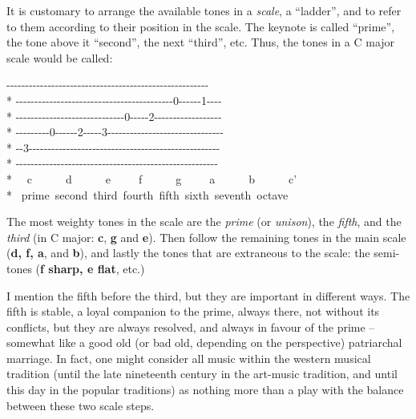 \begin{articlelayout}
It is customary to arrange the available tones in a \emph{scale}, a
``{}ladder''{}, and to refer to them according to their position in
the scale. The keynote is called ``{}prime''{}, the tone above it
``{}second''{}, the next ``{}third''{}, etc. Thus, the tones in a C
major scale would be called:
\begin{pre}\begin{adjustwidth}{2em}{0em}
{-}{-}{-}{-}{-}{-}{-}{-}{-}{-}{-}{-}{-}{-}{-}{-}{-}{-}{-}{-}{-}{-}{-}{-}{-}{-}{-}{-}{-}{-}{-}{-}{-}{-}{-}{-}{-}{-}{-}{-}{-}{-}{-}{-}{-}{-}{-}{-}{-}{-}{-}{-}{-}{-}\\*
{-}{-}{-}{-}{-}{-}{-}{-}{-}{-}{-}{-}{-}{-}{-}{-}{-}{-}{-}{-}{-}{-}{-}{-}{-}{-}{-}{-}{-}{-}{-}{-}{-}{-}{-}{-}{-}{-}{-}{-}{-}{-}0{-}{-}{-}{-}{-}{-}1{-}{-}{-}{-}\\*
{-}{-}{-}{-}{-}{-}{-}{-}{-}{-}{-}{-}{-}{-}{-}{-}{-}{-}{-}{-}{-}{-}{-}{-}{-}{-}{-}{-}-0{-}{-}{-}{-}-2{-}{-}{-}{-}{-}{-}{-}{-}{-}{-}{-}{-}{-}{-}{-}{-}{-}{-}\\*
{-}{-}{-}{-}{-}{-}{-}{-}-0{-}{-}{-}{-}{-}{-}2{-}{-}{-}{-}-3{-}{-}{-}{-}{-}{-}{-}{-}{-}{-}{-}{-}{-}{-}{-}{-}{-}{-}{-}{-}{-}{-}{-}{-}{-}{-}{-}{-}{-}{-}-\\*
{-}{-}3{-}{-}{-}{-}{-}{-}{-}{-}{-}{-}{-}{-}{-}{-}{-}{-}{-}{-}{-}{-}{-}{-}{-}{-}{-}{-}{-}{-}{-}{-}{-}{-}{-}{-}{-}{-}{-}{-}{-}{-}{-}{-}{-}{-}{-}{-}{-}{-}{-}{-}-\\*
{-}{-}{-}{-}{-}{-}{-}{-}{-}{-}{-}{-}{-}{-}{-}{-}{-}{-}{-}{-}{-}{-}{-}{-}{-}{-}{-}{-}{-}{-}{-}{-}{-}{-}{-}{-}{-}{-}{-}{-}{-}{-}{-}{-}{-}{-}{-}{-}{-}{-}{-}{-}{-}{-}\\*
~~c~~~~~~d~~~~~~e~~~~~f~~~~~~g~~~~~a~~~~~~b~~~~~~c'\\*
~prime~second~third~fourth~fifth~sixth~seventh~octave
\end{adjustwidth}\end{pre}

The most weighty tones in the scale are the \emph{prime} (or
\emph{unison}), the \emph{fifth}, and the \emph{third} (in C major:
\textbf{c}, \textbf{g} and \textbf{e}). Then follow the remaining
tones in the main scale (\textbf{d, f, a}, and \textbf{b}), and lastly
the tones that are extraneous to the scale: the semi-tones (\textbf{f
sharp, e flat}, etc.)

I mention the fifth before the third, but they are important in
different ways. The fifth is stable, a loyal companion to the prime,
always there, not without its conflicts, but they are always resolved,
and always in favour of the prime -- somewhat like a good old (or bad
old, depending on the perspective) patriarchal marriage. In fact, one
might consider all music within the western musical tradition (until
the late nineteenth century in the art-music tradition, and until this
day in the popular traditions) as nothing more than a play with the
balance between these two scale steps.


\end{articlelayout}
